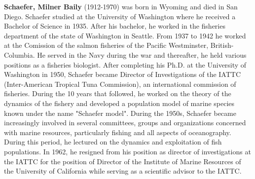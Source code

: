 \textbf{Schaefer, Milner Baily} (1912-1970) was born in Wyoming and died in San Diego. Schaefer studied at the University of Washington where he received a Bachelor of Science in 1935. After his bachelor, he worked in the fisheries department of the state of Washington in Seattle. From 1937 to 1942 he worked at the Comission of the salmon fisheries of the Pacific Westminster, British-Columbia. He served in the Navy during the war and thereafter, he held various positions as a fisheries biologist. After completing his Ph.D. at the University of Washington in 1950, Schaefer became Director of Investigations of the IATTC (Inter-American Tropical Tuna Commission), an international commission of fisheries. During the 10 years that followed, he worked on the theory of the dynamics of the fishery and developed a population model of marine species known under the name "Schaefer model". During the 1950s, Schaefer became increasingly involved in several committees, groups and organizations concerned with marine resources, particularly fishing and all aspects of oceanography. During this period, he lectured on the dynamics and exploitation of fish populations. In 1962, he resigned from his position as director of investigations at the IATTC for the position of Director of the Institute of Marine Resources of the University of California while serving as a scientific advisor to the IATTC.


